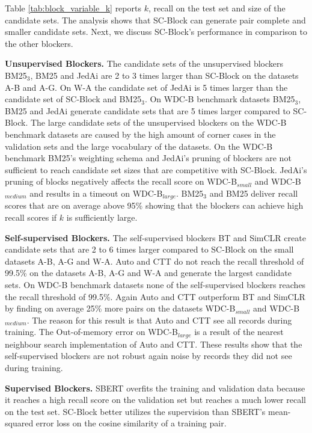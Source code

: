 \documentclass[sigconf,nonacm]{acmart}
\begin{document}
Table \ref{tab:block_variable_k} reports $k$, recall on the test set and size of the candidate sets. 
The analysis shows that SC-Block can generate pair complete and smaller candidate sets. Next, we discuss SC-Block's performance in comparison to the other blockers.

\vspace{.1cm}\noindent\textbf{Unsupervised Blockers.}
The candidate sets of the unsupervised blockers BM25$_{3}$, BM25 and JedAi are 2 to 3 times larger than SC-Block on the datasets A-B and A-G.
On W-A the candidate set of JedAi is 5 times larger than the candidate set of SC-Block and BM25$_3$.
On WDC-B benchmark datasets BM25$_{3}$, BM25 and JedAi generate candidate sets that are 5 times larger compared to SC-Block.
The large candidate sets of the unsupervised blockers on the WDC-B benchmark datasets are caused by the high amount of corner cases in the validation sets and the large vocabulary of the datasets.
On the WDC-B benchmark BM25's weighting schema and JedAi's pruning of blockers are not sufficient to reach candidate set sizes that are competitive with SC-Block.
JedAi's pruning of blocks negatively affects the recall score on WDC-B$_{small}$ and WDC-B$_{medium}$ and results in a timeout on WDC-B$_{large}$.
BM25$_{3}$ and BM25 deliver recall scores that are on average above 95\% showing that the blockers can achieve high recall scores if $k$ is sufficiently large.



\vspace{.1cm}\noindent\textbf{Self-supervised Blockers.}
The self-supervised blockers BT and SimCLR create candidate sets that are 2 to 6 times larger compared to SC-Block on the small datasets A-B, A-G and W-A.
Auto and CTT do not reach the recall threshold of 99.5\% on the datasets A-B, A-G and W-A and generate the largest candidate sets.
On WDC-B benchmark datasets none of the self-supervised blockers reaches the recall threshold of 99.5\%.
Again Auto and CTT outperform BT and SimCLR by finding on average 25\% more pairs on the datasets WDC-B$_{small}$ and WDC-B$_{medium}$. The reason for this result is that Auto and CTT see all records during training. The Out-of-memory error on WDC-B$_{large}$ is a result of the nearest neighbour search implementation of Auto and CTT.
These results show that the self-supervised blockers are not robust again noise by records they did not see during training.

\vspace{.1cm}\noindent\textbf{Supervised Blockers.}
SBERT overfits the training and validation data because it reaches a high recall score on the validation set but reaches a much lower recall on the test set.
SC-Block better utilizes the supervision than SBERT's mean-squared error loss on the cosine similarity of a training pair.
\end{document}
